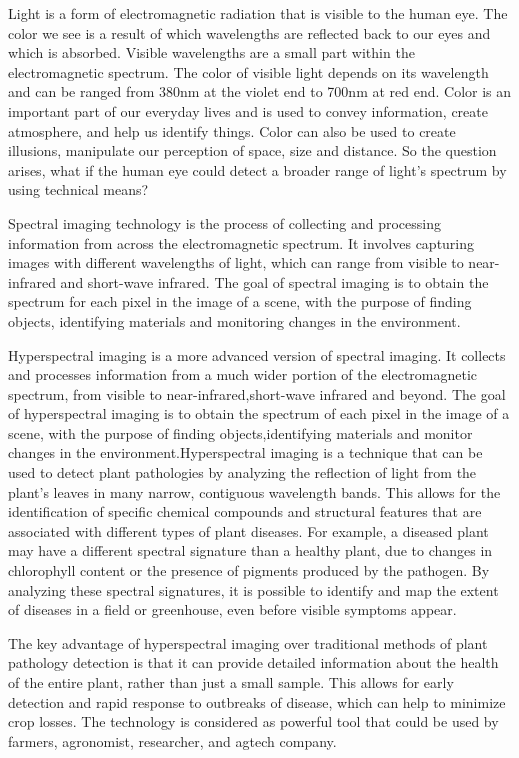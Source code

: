 \documentclass{article}
\begin{document}
{            \hspace{0.5cm}Light is a form of electromagnetic radiation that is visible to the human eye. The color we see is a result of which wavelengths are reflected back to our eyes and which is absorbed. Visible wavelengths are a small part within the electromagnetic spectrum. The color of visible light depends on its wavelength and can be ranged from 380nm at the violet end to 700nm at red end. Color is an important part of our everyday lives and is used to convey information, create atmosphere, and help us identify things. Color can also be used to create illusions, manipulate our perception of space, size and distance. So the question arises, what if the human eye could detect a broader range of light's spectrum by using technical means? \par
            Spectral imaging technology is the process of collecting and processing information from across the electromagnetic spectrum. It involves capturing images with different wavelengths of light, which can range from visible to near-infrared and short-wave infrared. The goal of spectral imaging is to obtain the spectrum for each pixel in the image of a scene, with the purpose of finding objects, identifying materials and monitoring changes in the environment.\par
            Hyperspectral imaging is a more advanced version of spectral imaging. It collects and processes information from a much wider portion of the electromagnetic spectrum, from visible to near-infrared,short-wave infrared and beyond. The goal of hyperspectral imaging is to obtain the spectrum of each pixel in the image of a scene, with the purpose of finding objects,identifying materials and monitor changes in the environment.Hyperspectral imaging is a technique that can be used to detect plant pathologies by analyzing the reflection of light from the plant's leaves in many narrow, contiguous wavelength bands. This allows for the identification of specific chemical compounds and structural features that are associated with different types of plant diseases. For example, a diseased plant may have a different spectral signature than a healthy plant, due to changes in chlorophyll content or the presence of pigments produced by the pathogen. By analyzing these spectral signatures, it is possible to identify and map the extent of diseases in a field or greenhouse, even before visible symptoms appear.\par
            The key advantage of hyperspectral imaging over traditional methods of plant pathology detection is that it can provide detailed information about the health of the entire plant, rather than just a small sample. This allows for early detection and rapid response to outbreaks of disease, which can help to minimize crop losses. The technology is considered as powerful tool that could be used by farmers, agronomist, researcher, and agtech company.\par
}
\end{document}
